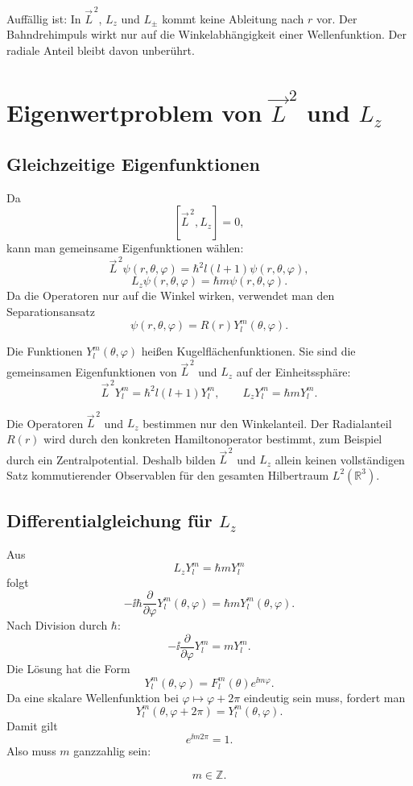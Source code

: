 \begin{notebox}
Auffällig ist: In \(\vec L^{\,2}\), \(L_z\) und \(L_\pm\) kommt keine Ableitung nach \(r\) vor. Der Bahndrehimpuls wirkt nur auf die Winkelabhängigkeit einer Wellenfunktion. Der radiale Anteil bleibt davon unberührt.
\end{notebox}

\section{Eigenwertproblem von \(\vec L^{\,2}\) und \(L_z\)}

\subsection{Gleichzeitige Eigenfunktionen}

Da
\[
    [\vec L^{\,2},L_z]=0,
\]
kann man gemeinsame Eigenfunktionen wählen:
\[
    \vec L^{\,2}\psi(r,\theta,\varphi)
    =\hbar^2l(l+1)\psi(r,\theta,\varphi),
\]
\[
    L_z\psi(r,\theta,\varphi)
    =\hbar m\psi(r,\theta,\varphi).
\]
Da die Operatoren nur auf die Winkel wirken, verwendet man den Separationsansatz
\[
    \psi(r,\theta,\varphi)=R(r)Y_l^m(\theta,\varphi).
\]

\begin{definitionbox}
Die Funktionen \(Y_l^m(\theta,\varphi)\) heißen Kugelflächenfunktionen. Sie sind die gemeinsamen Eigenfunktionen von \(\vec L^{\,2}\) und \(L_z\) auf der Einheitssphäre:
\[
    \vec L^{\,2}Y_l^m=\hbar^2l(l+1)Y_l^m,
    \qquad
    L_zY_l^m=\hbar mY_l^m.
\]
\end{definitionbox}

\begin{warningbox}
Die Operatoren \(\vec L^{\,2}\) und \(L_z\) bestimmen nur den Winkelanteil. Der Radialanteil \(R(r)\) wird durch den konkreten Hamiltonoperator bestimmt, zum Beispiel durch ein Zentralpotential. Deshalb bilden \(\vec L^{\,2}\) und \(L_z\) allein keinen vollständigen Satz kommutierender Observablen für den gesamten Hilbertraum \(L^2(\mathbb R^3)\).
\end{warningbox}

\subsection{Differentialgleichung für \(L_z\)}

Aus
\[
    L_zY_l^m=\hbar mY_l^m
\]
folgt
\[
    -\ii\hbar\frac{\partial}{\partial\varphi}Y_l^m(\theta,\varphi)
    =\hbar mY_l^m(\theta,\varphi).
\]
Nach Division durch \(\hbar\):
\[
    -\ii\frac{\partial}{\partial\varphi}Y_l^m=mY_l^m.
\]
Die Lösung hat die Form
\[
    Y_l^m(\theta,\varphi)=F_l^m(\theta)e^{\ii m\varphi}.
\]
Da eine skalare Wellenfunktion bei \(\varphi\mapsto \varphi+2\pi\) eindeutig sein muss, fordert man
\[
    Y_l^m(\theta,\varphi+2\pi)=Y_l^m(\theta,\varphi).
\]
Damit gilt
\[
    e^{\ii m2\pi}=1.
\]
Also muss \(m\) ganzzahlig sein:
\begin{formulabox}
\[
    m\in\mathbb Z.
\]
\end{formulabox}

